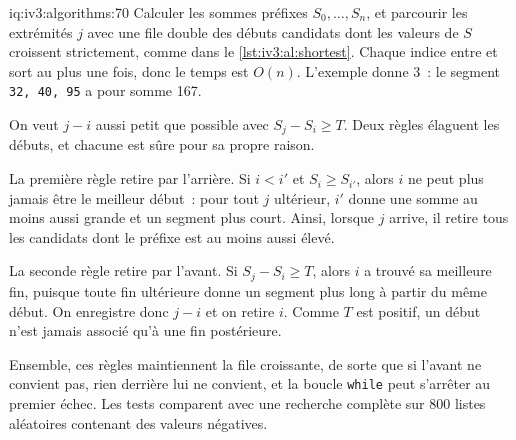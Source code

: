 \begin{solution}{iq:iv3:algorithms:70}
Calculer les sommes préfixes $S_0, \dots, S_n$, et parcourir les extrémités $j$ avec une file double des débuts candidats dont les valeurs de $S$ croissent strictement, comme dans le \cref{lst:iv3:al:shortest}. Chaque indice entre et sort au plus une fois, donc le temps est $O(n)$. L'exemple donne 3~: le segment \texttt{32, 40, 95} a pour somme 167.
\label{lst:iv3:al:shortest}

On veut $j - i$ aussi petit que possible avec $S_j - S_i \ge T$. Deux règles élaguent les débuts, et chacune est sûre pour sa propre raison.

La première règle retire par l'arrière. Si $i < i'$ et $S_i \ge S_{i'}$, alors $i$ ne peut plus jamais être le meilleur début~: pour tout $j$ ultérieur, $i'$ donne une somme au moins aussi grande et un segment plus court. Ainsi, lorsque $j$ arrive, il retire tous les candidats dont le préfixe est au moins aussi élevé.

La seconde règle retire par l'avant. Si $S_j - S_i \ge T$, alors $i$ a trouvé sa meilleure fin, puisque toute fin ultérieure donne un segment plus long à partir du même début. On enregistre donc $j - i$ et on retire $i$. Comme $T$ est positif, un début n'est jamais associé qu'à une fin postérieure.

Ensemble, ces règles maintiennent la file croissante, de sorte que si l'avant ne convient pas, rien derrière lui ne convient, et la boucle \texttt{while} peut s'arrêter au premier échec. Les tests comparent avec une recherche complète sur 800 listes aléatoires contenant des valeurs négatives.

\end{solution}

